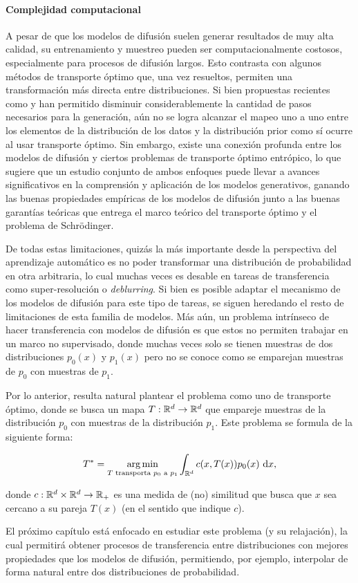 \paragraph{Complejidad computacional}

A pesar de que los modelos de difusión suelen generar resultados de muy alta calidad, su entrenamiento y muestreo pueden ser computacionalmente costosos, especialmente para procesos de difusión largos. Esto contrasta con algunos métodos de transporte óptimo que, una vez resueltos, permiten una transformación más directa entre distribuciones. Si bien propuestas recientes como \cite{song2023consistencymodels} y \cite{salimans2022progressivedistillationfastsampling} han permitido disminuir considerablemente la cantidad de pasos necesarios para la generación, aún no se logra alcanzar el mapeo uno a uno entre los elementos de la distribución de los datos y la distribución prior como sí ocurre al usar transporte óptimo. Sin embargo, existe una conexión profunda entre los modelos de difusión y ciertos problemas de transporte óptimo entrópico, lo que sugiere que un estudio conjunto de ambos enfoques puede llevar a avances significativos en la comprensión y aplicación de los modelos generativos, ganando las buenas propiedades empíricas de los modelos de difusión junto a las buenas garantías teóricas que entrega el marco teórico del transporte óptimo y el problema de Schrödinger.

De todas estas limitaciones, quizás la más importante desde la perspectiva del aprendizaje automático es no poder transformar una distribución de probabilidad en otra arbitraria, lo cual muchas veces es desable en tareas de transferencia como super-resolución o \textit{deblurring}. Si bien es posible adaptar el mecanismo de los modelos de difusión para este tipo de tareas, se siguen heredando el resto de limitaciones de esta familia de modelos. Más aún, un problema intrínseco de hacer transferencia con modelos de difusión es que estos no permiten trabajar en un marco no supervisado, donde muchas veces solo se tienen muestras de dos distribuciones $p_0(x)$ y $p_1(x)$ pero no se conoce como se emparejan muestras de $p_0$ con muestras de $p_1$.

Por lo anterior, resulta natural plantear el problema como uno de transporte óptimo, donde se busca un mapa $T:\mathbb{R}^d\to\mathbb{R}^d$ que empareje muestras de la distribución $p_0$ con muestras de la distribución $p_1$. Este problema se formula de la siguiente forma:

\begin{equation*}
    T^* = \operatorname*{arg\,min}_{T\text{ transporta $p_0$ a $p_1$}} \int_{\mathbb{R}^d} c(x,T(x)) p_0(x)\,\operatorname{d}\! x ,
\end{equation*}

donde $c:\mathbb{R}^d\times\mathbb{R}^d\to\mathbb{R}_+$ es una medida de (no) similitud que busca que $x$ sea cercano a su pareja $T(x)$ (en el sentido que indique $c$).

El próximo capítulo está enfocado en estudiar este problema (y su relajación), la cual permitirá obtener procesos de transferencia entre distribuciones con mejores propiedades que los modelos de difusión, permitiendo, por ejemplo, interpolar de forma natural entre dos distribuciones de probabilidad.